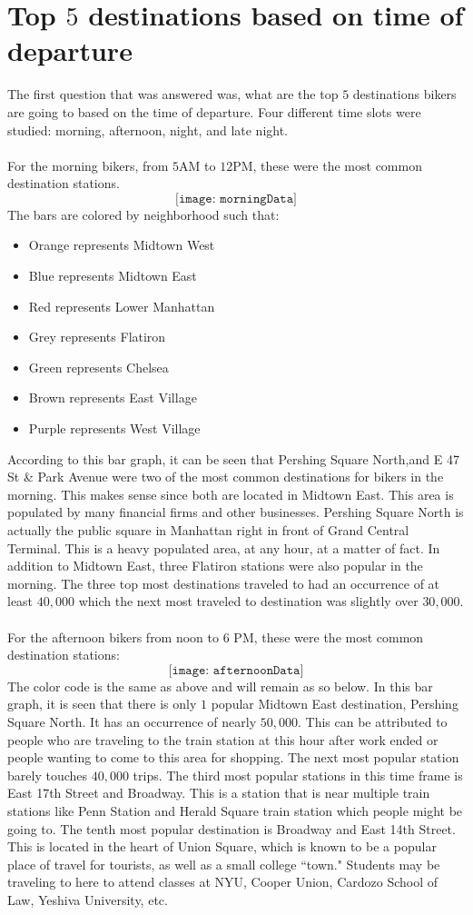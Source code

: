 \documentclass{article}
\begin{document}
\section{Top $5$ destinations based on time of departure} 
The first question that was answered was, what are the top $5$ destinations bikers are going to based on the time of departure. Four different time slots were studied: morning, afternoon, night, and late night. \\~\\
For the morning bikers, from $5$AM to $12$PM, these were the most common destination stations. 
$$ \texttt{[image: morningData]} $$ 
The bars are colored by neighborhood such that: 
\begin{itemize} \item Orange represents Midtown West \item Blue represents Midtown East \item Red represents Lower Manhattan \item Grey represents Flatiron \item Green represents Chelsea \item Brown represents East Village \item Purple represents West Village \end{itemize} 
According to this bar graph, it can be seen that Pershing Square North,and E 47 St \& Park Avenue were two of the most common destinations for bikers in the morning. This makes sense since both are located in Midtown East. This area is populated by many financial firms and other businesses. Pershing Square North is actually the public square in Manhattan right in front of Grand Central Terminal. This is a heavy populated area, at any hour, at a matter of fact. In addition to Midtown East, three Flatiron stations were also popular in the morning. The three top most destinations traveled to had an occurrence of at least $40,000$ which the next most traveled to destination was slightly over $30,000$. \\~\\
For the afternoon bikers from noon to $6$ PM, these were the most common destination stations: 
$$ \texttt{[image: afternoonData]} $$ 
The color code is the same as above and will remain as so below. In this bar graph, it is seen that there is only $1$ popular Midtown East destination, Pershing Square North. It has an occurrence of nearly $50,000$. This can be attributed to people who are traveling to the train station at this hour after work ended or people wanting to come to this area for shopping. The next most popular station barely touches $40,000$ trips. The third most popular stations in this time frame is East 17th Street and Broadway. This is a station that is near multiple train stations like Penn Station and Herald Square train station which people might be going to. The tenth most popular destination is Broadway and East 14th Street. This is located in the heart of Union Square, which is known to be a popular place of travel for tourists, as well as a small college ``town." Students may be traveling to here to attend classes at NYU, Cooper Union, Cardozo School of Law, Yeshiva University, etc.  \\~\\
\end{document}
